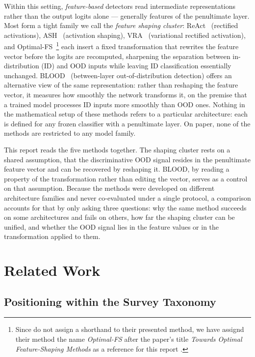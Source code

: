 \documentclass[a4paper]{article}
\begin{document}
Within this setting, \emph{feature-based} detectors read intermediate
representations rather than the output logits alone --- generally features of the penultimate layer.
 Most form a tight family we call the \emph{ feature shaping cluster}: ReAct~\citep{react} (rectified activations),
ASH~\citep{ash} (activation shaping), VRA~\citep{vra} (variational rectified
activation), and Optimal-FS~\citep{optimalfs}\footnote{Since \citet{optimalfs} do not assign a shorthand to their presented method, we have assignd their method the name \emph{Optimal-FS} after the paper's title \emph{Towards Optimal Feature-Shaping Methods} as a reference for this report .} each insert a fixed transformation that rewrites the feature
vector before the logits are recomputed, sharpening the separation between
in-distribution (ID) and OOD inputs while leaving ID classification essentially
unchanged. BLOOD~\citep{blood} (between-layer out-of-distribution detection) offers an
alternative view of the same representation: rather than reshaping the feature vector,
it measures how smoothly the network transforms it, on the premise that a trained model
processes ID inputs more smoothly than OOD ones. Nothing in the mathematical setup of
these methods refers to a particular architecture: each is defined for any frozen
classifier with a penultimate layer. On paper, none of the methods are restricted to any model family.

This report reads the five methods together. The shaping cluster rests on a shared
assumption, that the discriminative OOD signal resides in the penultimate feature
vector and can be recovered by reshaping it. BLOOD, by reading a property of the
transformation rather than editing the vector, serves as a control on that assumption.
Because the methods were developed on different architecture families and never
co-evaluated under a single protocol, a comparison accounts for that by only asking three questions: why the same method succeeds
on some architectures and fails on others, how far the shaping cluster can be unified,
and whether the OOD signal lies in the feature values or in the transformation applied
to them.

\section{Related Work}
\label{related}


\subsection{Positioning within the Survey Taxonomy}
\label{subsec:taxonomy}
\end{document}
